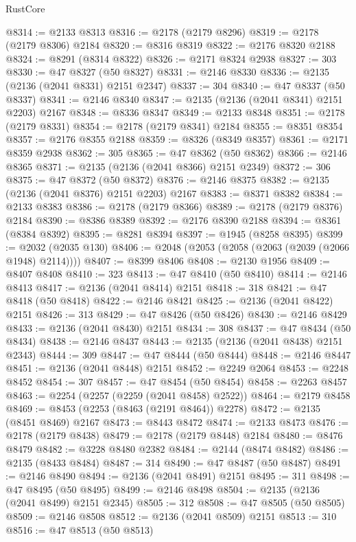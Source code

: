 \begin{lexlean}{RustCore}
\begin{coremodule}
@8314 := @2133 @8313
@8316 := @2178 (@2179 @8296)
@8319 := @2178 (@2179 @8306) @2184
@8320 := @8316 @8319
@8322 := @2176 @8320 @2188
@8324 := @8291 (@8314 @8322)
@8326 := @2171 @8324 @2938
@8327 := 303
@8330 := @47 @8327 (@50 @8327)
@8331 := @2146 @8330
@8336 := @2135 (@2136 (@2041 @8331) @2151 @2347)
@8337 := 304
@8340 := @47 @8337 (@50 @8337)
@8341 := @2146 @8340
@8347 := @2135 (@2136 (@2041 @8341) @2151 @2203) @2167
@8348 := @8336 @8347
@8349 := @2133 @8348
@8351 := @2178 (@2179 @8331)
@8354 := @2178 (@2179 @8341) @2184
@8355 := @8351 @8354
@8357 := @2176 @8355 @2188
@8359 := @8326 (@8349 @8357)
@8361 := @2171 @8359 @2938
@8362 := 305
@8365 := @47 @8362 (@50 @8362)
@8366 := @2146 @8365
@8371 := @2135 (@2136 (@2041 @8366) @2151 @2349)
@8372 := 306
@8375 := @47 @8372 (@50 @8372)
@8376 := @2146 @8375
@8382 := @2135 (@2136 (@2041 @8376) @2151 @2203) @2167
@8383 := @8371 @8382
@8384 := @2133 @8383
@8386 := @2178 (@2179 @8366)
@8389 := @2178 (@2179 @8376) @2184
@8390 := @8386 @8389
@8392 := @2176 @8390 @2188
@8394 := @8361 (@8384 @8392)
@8395 := @8281 @8394
@8397 := @1945 (@8258 @8395)
@8399 := @2032 (@2035 @130)
@8406 := @2048 (@2053 (@2058 (@2063 (@2039 (@2066 @1948) @2114))))
@8407 := @8399 @8406
@8408 := @2130 @1956
@8409 := @8407 @8408
@8410 := 323
@8413 := @47 @8410 (@50 @8410)
@8414 := @2146 @8413
@8417 := @2136 (@2041 @8414) @2151
@8418 := 318
@8421 := @47 @8418 (@50 @8418)
@8422 := @2146 @8421
@8425 := @2136 (@2041 @8422) @2151
@8426 := 313
@8429 := @47 @8426 (@50 @8426)
@8430 := @2146 @8429
@8433 := @2136 (@2041 @8430) @2151
@8434 := 308
@8437 := @47 @8434 (@50 @8434)
@8438 := @2146 @8437
@8443 := @2135 (@2136 (@2041 @8438) @2151 @2343)
@8444 := 309
@8447 := @47 @8444 (@50 @8444)
@8448 := @2146 @8447
@8451 := @2136 (@2041 @8448) @2151
@8452 := @2249 @2064
@8453 := @2248 @8452
@8454 := 307
@8457 := @47 @8454 (@50 @8454)
@8458 := @2263 @8457
@8463 := @2254 (@2257 (@2259 (@2041 @8458) @2522))
@8464 := @2179 @8458
@8469 := @8453 (@2253 (@8463 (@2191 @8464)) @2278)
@8472 := @2135 (@8451 @8469) @2167
@8473 := @8443 @8472
@8474 := @2133 @8473
@8476 := @2178 (@2179 @8438)
@8479 := @2178 (@2179 @8448) @2184
@8480 := @8476 @8479
@8482 := @3228 @8480 @2382
@8484 := @2144 (@8474 @8482)
@8486 := @2135 (@8433 @8484)
@8487 := 314
@8490 := @47 @8487 (@50 @8487)
@8491 := @2146 @8490
@8494 := @2136 (@2041 @8491) @2151
@8495 := 311
@8498 := @47 @8495 (@50 @8495)
@8499 := @2146 @8498
@8504 := @2135 (@2136 (@2041 @8499) @2151 @2345)
@8505 := 312
@8508 := @47 @8505 (@50 @8505)
@8509 := @2146 @8508
@8512 := @2136 (@2041 @8509) @2151
@8513 := 310
@8516 := @47 @8513 (@50 @8513)

\end{coremodule}
\end{lexlean}
